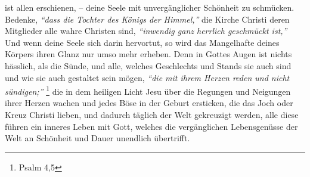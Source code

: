 ist allen erschienen, -- deine Seele mit unvergänglicher Schönheit zu schmücken.
Bedenke, \textit{"`dass die Tochter des Königs der Himmel,"'} die Kirche Christi
 deren
 Mitglieder alle wahre Christen
sind, \textit{"`inwendig ganz herrlich geschmückt ist,"'}
Und wenn deine Seele sich darin hervortut, so wird das Mangelhafte deines
Körpers ihren Glanz nur umso mehr erheben. Denn in Gottes Augen ist nichts
hässlich, als die Sünde, und alle, welches Geschlechts und Stands
sie auch
sind und wie sie auch gestaltet sein mögen,
\textit{"`die mit ihrem Herzen reden und
nicht sündigen;"'}
\footnote{Psalm 4,5}
die in dem heiligen Licht Jesu über die
Regungen und Neigungen ihrer Herzen wachen und jedes Böse in der Geburt
ersticken, die das Joch oder Kreuz Christi  lieben, und dadurch
täglich der Welt
gekreuzigt werden, alle diese führen ein inneres Leben mit
Gott, welches die
vergänglichen Lebensgenüsse der Welt an Schönheit und Dauer unendlich
übertrifft.

